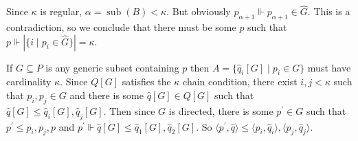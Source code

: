 \documentclass[12pt]{article}
\begin{document}
\bigskip{}
Since $\kappa$ is regular, $\alpha=\operatorname{sub}(B)<\kappa$.  But obviously $p_{\alpha+1}\Vdash p_{\alpha+1}\in \hat{G}$.  This is a contradiction, so we conclude that there must be some $p$ such that $p\Vdash |\{i\mid p_i\in \hat{G}\}|=\kappa$.

\bigskip{}


If $G\subseteq P$ is any generic subset containing $p$ then $A=\{\hat{q}_i[G]\mid p_i\in G\}$ must have cardinality $\kappa$.  Since $Q[G]$ satisfies the $\kappa$ chain condition, there exist $i,j<\kappa$ such that $p_i,p_j\in G$ and there is some $\hat{q}[G]\in Q[G]$ such that $\hat{q}[G]\leq\hat{q}_i[G],\hat{q}_j[G]$.  Then since $G$ is directed, there is some $p^\prime\in G$ such that $p^\prime\leq p_i,p_j,p$ and $p^\prime\Vdash \hat{q}[G]\leq\hat{q}_1[G],\hat{q}_2[G]$.  So $\langle p^\prime,\hat{q}\rangle\leq\langle p_i,\hat{q}_i\rangle,\langle p_j,\hat{q}_j\rangle$.
\end{document}
